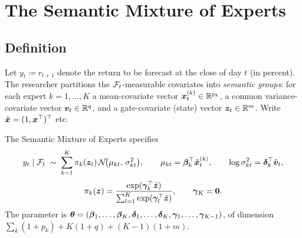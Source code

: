 \section{The Semantic Mixture of Experts}\label{sec:model}

\subsection{Definition}

Let $y_t\coloneqq r_{t+1}$ denote the return to be forecast at the close of day $t$ (in percent).
The researcher partitions the $\mathcal{F}_t$-measurable covariates into \emph{semantic groups}: for each
expert $k=1,\dots,K$ a mean-covariate vector $\bm{x}_t^{(k)}\in\mathbb{R}^{p_k}$, a common variance-covariate
vector $\bm{v}_t\in\mathbb{R}^{q}$, and a gate-covariate (state) vector $\bm{z}_t\in\mathbb{R}^{m}$. Write
$\tilde{\bm{x}}=(1,\bm{x}^\top)^\top$ etc.

\begin{definition}[SMoE]\label{def:smoe}
The Semantic Mixture of Experts specifies
\begin{equation}\label{eq:smoe}
  y_t\mid\mathcal{F}_t\;\sim\;\sum_{k=1}^K \pi_k(\bm{z}_t)\,\mathcal{N}\!\big(\mu_{kt},\,\sigma_{kt}^2\big),\qquad
  \mu_{kt}=\bm\beta_k^\top\tilde{\bm{x}}_t^{(k)},\qquad
  \log\sigma_{kt}^2=\bm\delta_k^\top\tilde{\bm{v}}_t,
\end{equation}
\begin{equation}\label{eq:gate}
  \pi_k(\bm{z})=\frac{\exp(\bm\gamma_k^\top\tilde{\bm{z}})}{\sum_{l=1}^K\exp(\bm\gamma_l^\top\tilde{\bm{z}})},\qquad \bm\gamma_K=\bm0 .
\end{equation}
The parameter is $\bm{\theta}=(\bm\beta_1,\dots,\bm\beta_K,\bm\delta_1,\dots,\bm\delta_K,\bm\gamma_1,\dots,\bm\gamma_{K-1})$,
of dimension $\sum_k(1+p_k)+K(1+q)+(K-1)(1+m)$.
\end{definition}

